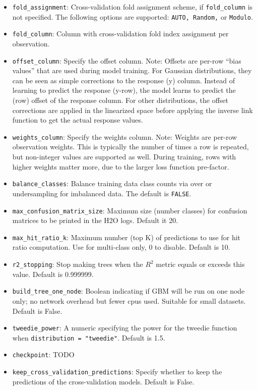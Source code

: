 \begin{itemize}
\item \texttt{fold\_assignment}: Cross-validation fold assignment scheme, if \texttt{fold\_column} is not specified. The following options are supported: \texttt{AUTO, Random,} or \texttt{Modulo}. 
\item \texttt{fold\_column}:  Column with cross-validation fold index assignment per observation. 
\item \texttt{offset\_column}: Specify the offset column. Note: Offsets are per-row “bias values” that are used during model training. For Gaussian distributions, they can be seen as simple corrections to the response (y) column. Instead of learning to predict the response (y-row), the model learns to predict the (row) offset of the response column. For other distributions, the offset corrections are applied in the linearized space before applying the inverse link function to get the actual response values. 
\item \texttt{weights\_column}: Specify the weights column. Note: Weights are per-row observation weights. This is typically the number of times a row is repeated, but non-integer values are supported as well. During training, rows with higher weights matter more, due to the larger loss function pre-factor.
\item {\texttt{balance\_classes}}: Balance training data class counts via over or undersampling for imbalanced data. The default is {\texttt{FALSE}}.
\item {\texttt{max\_confusion\_matrix\_size}}: Maximum size (number classes) for confusion matrices to be printed in the H2O logs.  Default it 20.
\item {\texttt{max\_hit\_ratio\_k}}: Maximum number (top K) of predictions to use for hit ratio computation.  Use for multi-class only, 0 to disable.  Default is 10.
\item {\texttt{r2\_stopping}}: Stop making trees when the $R^2$ metric equals or exceeds this value.  Default is 0.999999.
\item {\texttt{build\_tree\_one\_node}}: Boolean indicating if GBM will be run on one node only; no network overhead but fewer cpus used. Suitable for small datasets.  Default is False.
\item {\texttt{tweedie\_power}}: A numeric specifying the power for the tweedie function when \texttt{distribution = "tweedie"}.  Default is 1.5.
\item {\texttt{checkpoint}}: TODO
\item {\texttt{keep\_cross\_validation\_predictions}}: Specify whether to keep the predictions of the cross-validation models.   Default is False.

\end{itemize}
